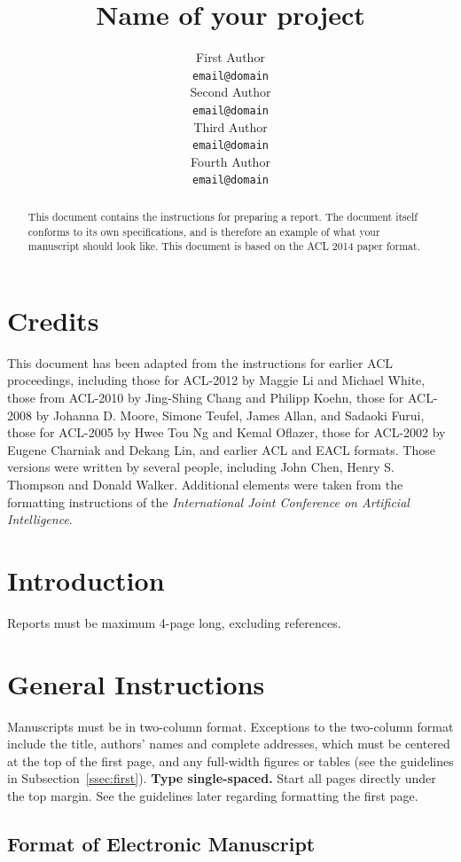 \documentclass[11pt]{article}
\title{Name of your project}
\author{First Author \\
  {\tt email@domain} \\\And
  Second Author \\
  {\tt email@domain} \\\And
Third Author \\
{\tt email@domain} \\\And
Fourth Author \\
{\tt email@domain} \\}
\date{}
\begin{document}
\maketitle
\begin{abstract}
  This document contains the instructions for preparing a report. The document itself conforms to its own specifications, and is therefore an example of what your manuscript should look like. This document is based on the ACL 2014 paper format.
\end{abstract}

\section{Credits}

This document has been adapted from the instructions for earlier ACL
proceedings, including those for ACL-2012 by Maggie Li and Michael
White, those from ACL-2010 by Jing-Shing Chang and Philipp Koehn,
those for ACL-2008 by Johanna D. Moore, Simone Teufel, James Allan,
and Sadaoki Furui, those for ACL-2005 by Hwee Tou Ng and Kemal
Oflazer, those for ACL-2002 by Eugene Charniak and Dekang Lin, and
earlier ACL and EACL formats. Those versions were written by several
people, including John Chen, Henry S. Thompson and Donald
Walker. Additional elements were taken from the formatting
instructions of the {\em International Joint Conference on Artificial
  Intelligence}.

\section{Introduction}

Reports must be maximum 4-page long, excluding references.

\section{General Instructions}

Manuscripts must be in two-column format.  Exceptions to the
two-column format include the title, authors' names and complete
addresses, which must be centered at the top of the first page, and
any full-width figures or tables (see the guidelines in
Subsection~\ref{ssec:first}). {\bf Type single-spaced.}  Start all
pages directly under the top margin. See the guidelines later
regarding formatting the first page.

\subsection{Format of Electronic Manuscript}
\label{sect:pdf}
\end{document}
